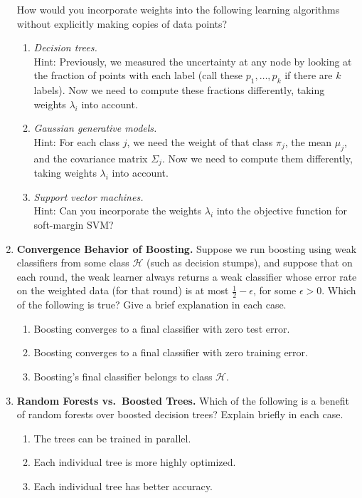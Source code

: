 \documentclass[11pt]{article}
\begin{document}
\begin{enumerate}
  How would you incorporate weights into the following learning algorithms without explicitly making copies of data points?
    \begin{enumerate}
      \item \emph{Decision trees.}\\
      Hint: Previously, we measured the uncertainty at any node by looking at the fraction of points with each label (call these $p_1,\dots,p_k$ if there are $k$ labels). Now we need to compute these fractions differently, taking weights $\lambda_i$ into account.

      \item \emph{Gaussian generative models.}\\
      Hint: For each class $j$, we need the weight of that class $\pi_j$, the mean $\mu_j$, and the covariance matrix $\Sigma_j$. Now we need to compute them differently, taking weights $\lambda_i$ into account.

      \item \emph{Support vector machines.}\\
      Hint: Can you incorporate the weights $\lambda_i$ into the objective function for soft-margin SVM?
    \end{enumerate}

  \item \textbf{Convergence Behavior of Boosting.} Suppose we run boosting using weak classifiers from some class $\mathcal H$ (such as decision stumps), and suppose that on each round, the weak learner always returns a weak classifier whose error rate on the weighted data (for that round) is at most $\tfrac12 - \epsilon$, for some $\epsilon>0$. Which of the following is true? Give a brief explanation in each case.
    \begin{enumerate}
      \item Boosting converges to a final classifier with zero test error.
      \item Boosting converges to a final classifier with zero training error.
      \item Boosting’s final classifier belongs to class $\mathcal H$.
    \end{enumerate}

  \item \textbf{Random Forests vs.\ Boosted Trees.} Which of the following is a benefit of random forests over boosted decision trees? Explain briefly in each case.
    \begin{enumerate}
      \item The trees can be trained in parallel.
      \item Each individual tree is more highly optimized.
      \item Each individual tree has better accuracy.
    \end{enumerate}
\end{enumerate}
\end{document}
